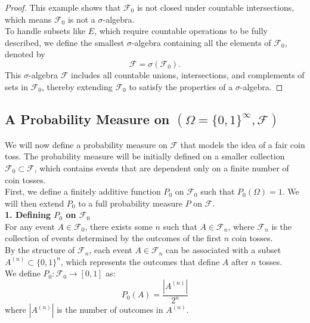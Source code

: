\begin{proof}
This example shows that \( \mathcal{F}_0 \) is not closed under countable intersections, which means \( \mathcal{F}_0 \) is not a $\sigma$-algebra.\\

To handle subsets like \( E \), which require countable operations to be fully described, we define the smallest $\sigma$-algebra containing all the elements of \( \mathcal{F}_0 \), denoted by
\[
\mathcal{F} = \sigma(\mathcal{F}_0).
\]
This $\sigma$-algebra \( \mathcal{F} \) includes all countable unions, intersections, and complements of sets in \( \mathcal{F}_0 \), thereby extending \( \mathcal{F}_0 \) to satisfy the properties of a $\sigma$-algebra.

\end{proof}

\subsection{A Probability Measure on \( (\Omega = \{0, 1\}^\infty, \mathcal{F}) \)}

We will now define a probability measure on \( \mathcal{F} \) that models the idea of a fair coin toss. The probability measure will be initially defined on a smaller collection \( \mathcal{F}_0 \subset \mathcal{F} \), which contains events that are dependent only on a finite number of coin tosses.\\

First, we define a finitely additive function \( P_0 \) on \( \mathcal{F}_0 \) such that \( P_0(\Omega) = 1 \). We will then extend \( P_0 \) to a full probability measure \( P \) on \( \mathcal{F} \).\\

\textbf{1. Defining \( P_0 \) on \( \mathcal{F}_0 \)}\\

For any event \( A \in \mathcal{F}_0 \), there exists some \( n \) such that \( A \in \mathcal{F}_n \), where \( \mathcal{F}_n \) is the collection of events determined by the outcomes of the first \( n \) coin tosses.\\

By the structure of \( \mathcal{F}_n \), each event \( A \in \mathcal{F}_n \) can be associated with a subset \( A^{(n)} \subset \{0, 1\}^n \), which represents the outcomes that define \( A \) after \( n \) tosses.\\

We define \( P_0: \mathcal{F}_0 \to [0, 1] \) as:
    \[
    P_0(A) = \frac{|A^{(n)}|}{2^n}
    \]
where \( |A^{(n)}| \) is the number of outcomes in \( A^{(n)} \).\\

